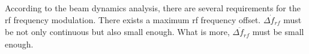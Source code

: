 According to the beam dynamics analysis, there are several requirements for the rf frequency modulation. There exists a maximum rf frequency offset. $\dot{\Delta f_{\mathit{rf}}}$ must be not only continuous but also small enough. What is more, $\ddot{\Delta f_{\mathit{rf}}}$ must be small enough. 
%
%
%
%
%
%
%
%


